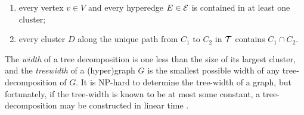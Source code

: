 \documentclass[twoside]{article}
\begin{document}
\begin{enumerate}[itemsep=0pt]
\item every vertex $v \in V$ and every hyperedge $E \in \mathcal E$ is
        contained in at least one cluster; 
      \item every cluster $D$ along the unique path from $C_1$ to
          $C_2$ in $\cal T$
contains $C_1 \cap C_2$. 
\end{enumerate}

The \emph{width} of a tree decomposition is one less than the size of
its largest cluster,
and the \emph{treewidth} of a (hyper)graph $G$ is the smallest
possible width of any tree-decomposition of $G$. 
It is NP-hard to determine the tree-width of a graph, but fortunately, if the tree-width is known to be at most some constant, a tree-decomposition may be constructed in linear time \parencite{bodlaender1993linear}.
\end{document}
